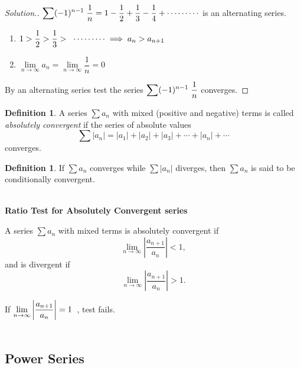 \documentclass[11pt,a4paper]{article}
\theoremstyle{definition}
\newtheorem{defn}[thm]{Definition}
\newenvironment{solution}
  {\renewcommand{\qedsymbol}{}\begin{proof}[\textit{Solution}.]}
  {\end{proof}}
\newcommand{\subhead}[1]{%
  \par\medskip\noindent\textbf{#1}\par\nobreak\smallskip}
\begin{document}
\begin{solution}
$\displaystyle{\sum (-1)^{n-1}\hspace{0.1cm}\frac{1}{n} = 1 - \frac{1}{2} + \frac{1}{3} - \frac{1}{4} + \cdots\cdots\cdots}$ is an alternating series.

\begin{enumerate}
\item[$i$.] $1 > \dfrac{1}{2} > \dfrac{1}{3}>\hspace{0.2cm}\cdots\cdots\cdots\implies a_n > a_{n + 1}$

\item[$ii$.] $\lim\limits_{n \rightarrow \infty} a_n  = \lim\limits_{n \rightarrow \infty} \dfrac{1}{n} = 0$
\end{enumerate}

By an alternating series test the series $\displaystyle{\sum (-1)^{n-1}\hspace{0.1cm}\frac{1}{n}}$ converges.
\end{solution}

\begin{defn}
A series $\displaystyle{\sum a_n}$ with mixed (positive and negative) terms is
called \emph{absolutely convergent} if the series of absolute values
$$\sum \left|a_n\right| = \left|a_1\right| + \left|a_2\right| + \left|a_3\right|
+ \cdots + \left|a_n\right| + \cdots$$
converges.
\end{defn}

\begin{defn}

If $\displaystyle{\sum a_n}$ converges while $\displaystyle{\sum \left|a_n\right|}$ diverges, then $\displaystyle{\sum a_n}$ is said to be conditionally convergent.\\\\

\subhead{Ratio Test for Absolutely Convergent series}

A series $\displaystyle{\sum a_n}$ with mixed terms is absolutely convergent if
$$\lim\limits_{n\rightarrow \infty}\left|\dfrac{a_{n+1}}{a_n}\right| < 1 ,$$
and is divergent if
$$\lim\limits_{n\rightarrow \infty}\left|\dfrac{a_{n+1}}{a_n}\right| > 1 .$$

If $\displaystyle{\lim\limits_{n\rightarrow \infty}\left|\dfrac{a_{n+1}}{a_n}\right| = 1}\hspace{0.2cm}$, test fails.\\\\
\end{defn}

\subsection{Power Series}
\end{document}
